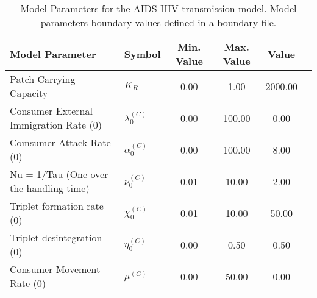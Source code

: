 \begin{table}
\centering
\begin{tabular}{p{5cm}lcccc}
{\bf Model Parameter} & {\bf Symbol} & {\bf Min. Value} & {\bf Max. Value} & {\bf Value}\\
\hline\hline
Patch Carrying Capacity & $K_R$ & 0.00 & 1.00 & 2000.00\\
Consumer External Immigration Rate (0) & $\lambda^{(C)}_0$ & 0.00 & 100.00 & 0.00\\
Comsumer Attack Rate (0) & $\alpha^{(C)}_0$ & 0.00 & 100.00 & 8.00\\
Nu = 1/Tau (One over the handling time) & $\nu^{(C)}_0$ & 0.01 & 10.00 & 2.00\\
Triplet formation rate (0) & $\chi^{(C)}_0$ & 0.01 & 10.00 & 50.00\\
Triplet desintegration (0) & $\eta^{(C)}_0$ & 0.00 & 0.50 & 0.50\\
Consumer Movement Rate (0) & $\mu^{(C)}$ & 0.00 & 50.00 & 0.00\\
\hline\hline
\end{tabular}
\caption{Model Parameters for the AIDS-HIV transmission model. Model parameters boundary values defined in a boundary file.}
\end{table}
